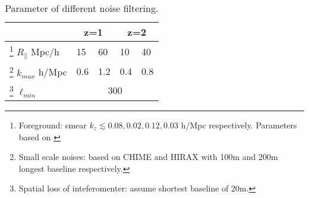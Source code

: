 \begin{table}
\begin{tabular}{|m{3cm}|m{1cm}|m{1cm}|m{1cm}|m{1cm}|}
    \hline
     & \multicolumn{2}{|c|}{z=1} &\multicolumn{2}{|c|}{z=2}\\
     \hline
     \footnote{Foreground: smear $k_z\lesssim 0.08,0.02,0.12,0.03$ h/Mpc respectively. Parameters based on \cite{2013ApJ...763L..20M,Switzer13,15Shaw}}
     $R_\parallel$
     Mpc/h & 15 & 60 & 10 & 40 \\
     \hline
     \footnote{Small scale noises: based on CHIME\cite{2014CHIME} and HIRAX\cite{HIRAX} 
     with 100m and 200m longest baseline respectively.}
     $k_{max}$
     h/Mpc & 0.6 & 1.2 & 0.4 & 0.8 \\
     \hline
     \footnote{Spatial loss of inteferomenter: assume shortest baseline of 20m.}
     $\ell_{min}$
     & \multicolumn{4}{|c|}{300} \\
     \hline
\end{tabular}
     \caption{Parameter of different noise filtering.}
     \label{tab:para}
\end{table}
